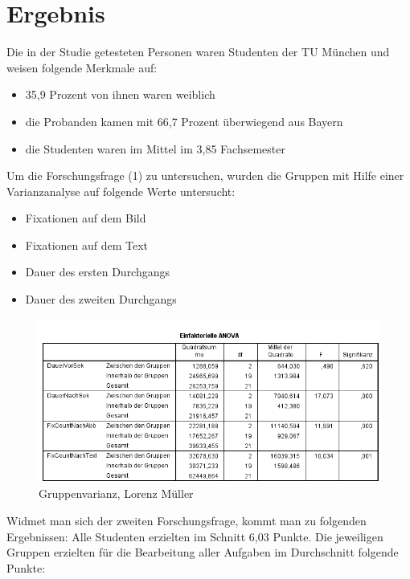 \chapter{Ergebnis}

Die in der Studie getesteten Personen waren Studenten der TU München und weisen folgende Merkmale auf:

    \begin{itemize}
        \item 35,9 Prozent von ihnen waren weiblich 
        \item die Probanden kamen mit 66,7 Prozent überwiegend aus Bayern
        \item die Studenten waren im Mittel im 3,85 Fachsemester
    \end{itemize}

 Um die Forschungsfrage (1) zu untersuchen, wurden die Gruppen mit Hilfe einer Varianzanalyse auf folgende Werte untersucht:
    \begin{itemize}
        \item Fixationen auf dem Bild 
        \item Fixationen auf dem Text
        \item Dauer des ersten Durchgangs
        \item Dauer des zweiten Durchgangs
    \end{itemize}

\begin{figure}[H]
\noindent\hspace{0.5mm}\includegraphics[width=15cm]{./Ressourcen/Gruppenunterscheidung.png}
\caption{Gruppenvarianz, Lorenz Müller}
\end{figure}

Widmet man sich der zweiten Forschungsfrage, kommt man zu folgenden Ergebnissen:
Alle Studenten erzielten im Schnitt 6,03 Punkte. 
Die jeweiligen Gruppen erzielten für die Bearbeitung aller Aufgaben im Durchschnitt folgende Punkte:

